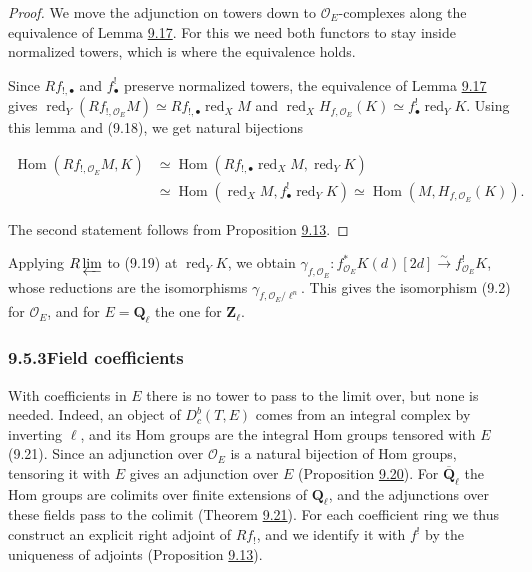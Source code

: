 \documentclass[11pt]{article}
\providecommand{\Dbc}{}\renewcommand{\Dbc}{D^b_c}
\providecommand{\Hom}{}\renewcommand{\Hom}{\operatorname{Hom}}
\begin{document}
\begin{proof}[{Proof}]\label{bp64}%
We move the adjunction on towers down to \(\mathcal O_E\)-complexes along the equivalence of Lemma \hyperref[bp57]{9.17}. For this we need both functors to stay inside normalized towers, which is where the equivalence holds.

Since \(Rf_{!,\bullet}\) and \(f^!_\bullet\) preserve normalized towers, the equivalence of Lemma \hyperref[bp57]{9.17} gives \(\operatorname{red}_Y(Rf_{!,\mathcal O_E}M)\simeq Rf_{!,\bullet}\operatorname{red}_XM\) and \(\operatorname{red}_XH_{f,\mathcal O_E}(K)\simeq f^!_\bullet\operatorname{red}_YK\). Using this lemma and (9.18), we get natural bijections

\[
\begin{aligned}
\Hom(Rf_{!,\mathcal O_E}M,K)
&\simeq\Hom(Rf_{!,\bullet}\operatorname{red}_XM,\operatorname{red}_YK)\\
&\simeq\Hom(\operatorname{red}_XM,f_\bullet^!\operatorname{red}_YK)
\simeq\Hom(M,H_{f,\mathcal O_E}(K)).
\end{aligned}
\]

The second statement follows from Proposition \hyperref[bp43]{9.13}.
\end{proof}

\label{bp65}%
Applying \(R\varprojlim\) to (9.19) at \(\operatorname{red}_YK\), we obtain \(\gamma_{f,\mathcal O_E}:f^*_{\mathcal O_E}K(d)[2d]\xrightarrow{\sim}f^!_{\mathcal O_E}K\), whose reductions are the isomorphisms \(\gamma_{f,\mathcal O_E/\ell^n}\). This gives the isomorphism (9.2) for \(\mathcal O_E\), and for \(E=\mathbf Q_\ell\) the one for \(\mathbf Z_\ell\).


\subsubsection*{\texorpdfstring{9.5.3\quad Field coefficients}{9.5.3 Field coefficients}}
\label{bp66}%
\label{bp67}%
With coefficients in \(E\) there is no tower to pass to the limit over, but none is needed. Indeed, an object of \(\Dbc(T,E)\) comes from an integral complex by inverting \(\ell\), and its Hom groups are the integral Hom groups tensored with \(E\) (9.21). Since an adjunction over \(\mathcal O_E\) is a natural bijection of Hom groups, tensoring it with \(E\) gives an adjunction over \(E\) (Proposition \hyperref[bp68]{9.20}). For \(\overline{\mathbf Q}_\ell\) the Hom groups are colimits over finite extensions of \(\mathbf Q_\ell\), and the adjunctions over these fields pass to the colimit (Theorem \hyperref[bp71]{9.21}). For each coefficient ring we thus construct an explicit right adjoint of \(Rf_!\), and we identify it with \(f^!\) by the uniqueness of adjoints (Proposition \hyperref[bp43]{9.13}).
\end{document}
